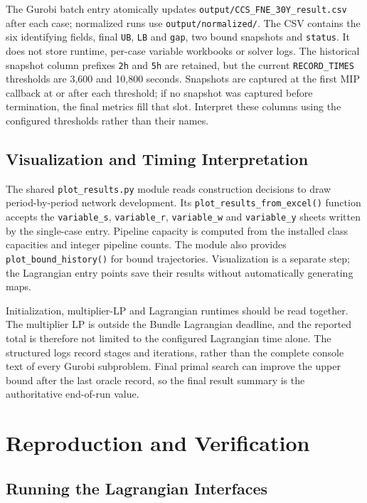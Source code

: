 \documentclass[11pt,letterpaper]{article}
\newcommand{\file}[1]{\texttt{\small\nolinkurl{#1}}}
\begin{document}
The Gurobi batch entry atomically updates \file{output/CCS_FNE_30Y_result.csv} after each case; normalized runs use \file{output/normalized/}. The CSV contains the six identifying fields, final \file{UB}, \file{LB} and \file{gap}, two bound snapshots and \file{status}. It does not store runtime, per-case variable workbooks or solver logs. The historical snapshot column prefixes \file{2h} and \file{5h} are retained, but the current \file{RECORD_TIMES} thresholds are 3,600 and 10,800 seconds. Snapshots are captured at the first MIP callback at or after each threshold; if no snapshot was captured before termination, the final metrics fill that slot. Interpret these columns using the configured thresholds rather than their names.

\subsection{Visualization and Timing Interpretation}

The shared \file{plot_results.py} module reads construction decisions to draw period-by-period network development. Its \file{plot_results_from_excel()} function accepts the \texttt{variable\_s}, \texttt{variable\_r}, \texttt{variable\_w} and \texttt{variable\_y} sheets written by the single-case entry. Pipeline capacity is computed from the installed class capacities and integer pipeline counts. The module also provides \file{plot_bound_history()} for bound trajectories. Visualization is a separate step; the Lagrangian entry points save their results without automatically generating maps.

Initialization, multiplier-LP and Lagrangian runtimes should be read together. The multiplier LP is outside the Bundle Lagrangian deadline, and the reported total is therefore not limited to the configured Lagrangian time alone. The structured logs record stages and iterations, rather than the complete console text of every Gurobi subproblem. Final primal search can improve the upper bound after the last oracle record, so the final result summary is the authoritative end-of-run value.

\section{Reproduction and Verification}
\subsection{Running the Lagrangian Interfaces}
\end{document}
